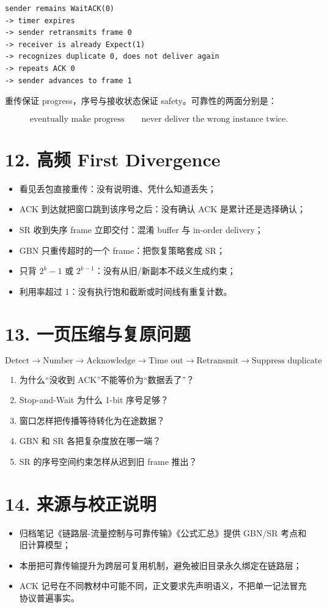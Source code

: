 \documentclass[UTF8,fontset=none,11pt,a4paper]{ctexart}
\providecommand{\tightlist}{\setlength{\itemsep}{0pt}\setlength{\parskip}{0pt}}
\begin{document}
\begin{lstlisting}
sender remains WaitACK(0)
-> timer expires
-> sender retransmits frame 0
-> receiver is already Expect(1)
-> recognizes duplicate 0, does not deliver again
-> repeats ACK 0
-> sender advances to frame 1
\end{lstlisting}

重传保证 progress，序号与接收状态保证 safety。可靠性的两面分别是：

\[
\boxed{\text{eventually make progress}}
\qquad
\boxed{\text{never deliver the wrong instance twice}}.
\]

\section{12. 高频 First
Divergence}\label{12-ux9ad8ux9891-first-divergence}

\begin{itemize}
\tightlist
\item
  看见丢包直接重传：没有说明谁、凭什么知道丢失；
\item
  ACK 到达就把窗口跳到该序号之后：没有确认 ACK 是累计还是选择确认；
\item
  SR 收到失序 frame 立即交付：混淆 buffer 与 in-order delivery；
\item
  GBN 只重传超时的一个 frame：把恢复策略套成 SR；
\item
  只背 \(2^k-1\) 或 \(2^{k-1}\)：没有从旧/新副本不歧义生成约束；
\item
  利用率超过 1：没有执行饱和截断或时间线有重复计数。
\end{itemize}

\section{13.
一页压缩与复原问题}\label{13-ux4e00ux9875ux538bux7f29ux4e0eux590dux539fux95eeux9898}

\[
\boxed{
\text{Detect}
\to \text{Number}
\to \text{Acknowledge}
\to \text{Time out}
\to \text{Retransmit}
\to \text{Suppress duplicate}
}
\]

\begin{enumerate}
\def\labelenumi{\arabic{enumi}.}
\tightlist
\item
  为什么``没收到 ACK''不能等价为``数据丢了''？
\item
  Stop-and-Wait 为什么 1-bit 序号足够？
\item
  窗口怎样把传播等待转化为在途数据？
\item
  GBN 和 SR 各把复杂度放在哪一端？
\item
  SR 的序号空间约束怎样从迟到旧 frame 推出？
\end{enumerate}

\section{14.
来源与校正说明}\label{14-ux6765ux6e90ux4e0eux6821ux6b63ux8bf4ux660e}

\begin{itemize}
\tightlist
\item
  归档笔记《链路层-流量控制与可靠传输》《公式汇总》提供 GBN/SR
  考点和旧计算模型；
\item
  本册把可靠传输提升为跨层可复用机制，避免被旧目录永久绑定在链路层；
\item
  ACK
  记号在不同教材中可能不同，正文要求先声明语义，不把单一记法冒充协议普遍事实。
\end{itemize}
\end{document}
